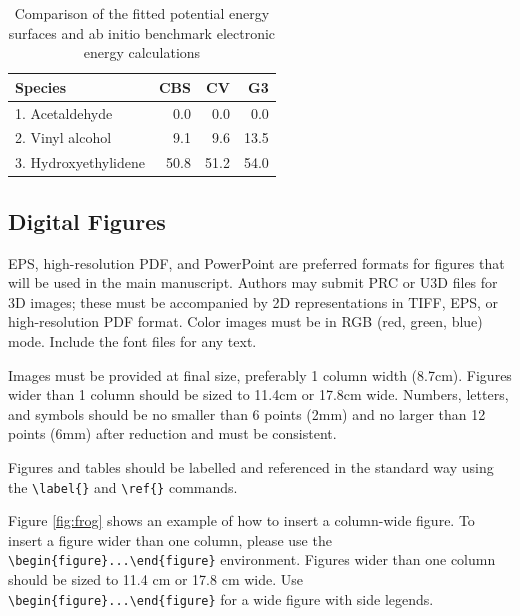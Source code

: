 \documentclass[9pt,twocolumn,twoside]{pnas-new}
\begin{document}
\begin{table}[t!]
\centering
\caption{Comparison of the fitted potential energy surfaces and ab initio benchmark electronic energy calculations}
\begin{tabular}{lrrr}
Species & CBS & CV & G3 \\
\midrule
1. Acetaldehyde & 0.0 & 0.0 & 0.0 \\
2. Vinyl alcohol & 9.1 & 9.6 & 13.5 \\
3. Hydroxyethylidene & 50.8 & 51.2 & 54.0\\
\bottomrule
\end{tabular}

\end{table}


\subsection*{Digital Figures}

EPS, high-resolution PDF, and PowerPoint are preferred formats for figures that will be used in the main manuscript. Authors may submit PRC or U3D files for 3D images; these must be accompanied by 2D representations in TIFF, EPS, or high-resolution PDF format. Color images must be in RGB (red, green, blue) mode. Include the font files for any text.

Images must be provided at final size, preferably 1 column width (8.7cm). Figures wider than 1 column should be sized to 11.4cm or 17.8cm wide. Numbers, letters, and symbols should be no smaller than 6 points (2mm) and no larger than 12 points (6mm) after reduction and must be consistent.

Figures and tables should be labelled and referenced in the standard way using the \verb|\label{}| and \verb|\ref{}| commands.

Figure \ref{fig:frog} shows an example of how to insert a column-wide figure. To insert a figure wider than one column, please use the \verb|\begin{figure}...\end{figure}| environment. Figures wider than one column should be sized to 11.4 cm or 17.8 cm wide. Use \verb|\begin{figure}...\end{figure}| for a wide figure with side legends.
\end{document}
